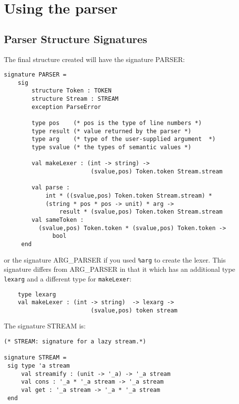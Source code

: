 \section{Using the parser}
\subsection{Parser Structure Signatures}
The final structure created will have the signature PARSER:
\begin{tt}
\begin{verbatim}
signature PARSER =
    sig
        structure Token : TOKEN
        structure Stream : STREAM
        exception ParseError

        type pos    (* pos is the type of line numbers *)
        type result (* value returned by the parser *)
        type arg    (* type of the user-supplied argument  *)
        type svalue (* the types of semantic values *)

        val makeLexer : (int -> string) ->
                         (svalue,pos) Token.token Stream.stream

        val parse :
            int * ((svalue,pos) Token.token Stream.stream) *
            (string * pos * pos -> unit) * arg ->
                result * (svalue,pos) Token.token Stream.stream
        val sameToken :
          (svalue,pos) Token.token * (svalue,pos) Token.token ->
              bool
     end
\end{verbatim}
\end{tt}
or the signature ARG\_PARSER if you used {\tt \%arg} to create the lexer.
This signature differs from ARG\_PARSER in that it
which has an additional type {\tt lexarg} and a different type
for {\tt makeLexer}:
\begin{tt}
\begin{verbatim}
    type lexarg
    val makeLexer : (int -> string)  -> lexarg ->
                         (svalue,pos) token stream
\end{verbatim}
\end{tt}

The signature STREAM is:
\begin{tt}
\begin{verbatim}
(* STREAM: signature for a lazy stream.*)

signature STREAM =
 sig type 'a stream
     val streamify : (unit -> '_a) -> '_a stream
     val cons : '_a * '_a stream -> '_a stream
     val get : '_a stream -> '_a * '_a stream
 end
\end{verbatim}
\end{tt}

